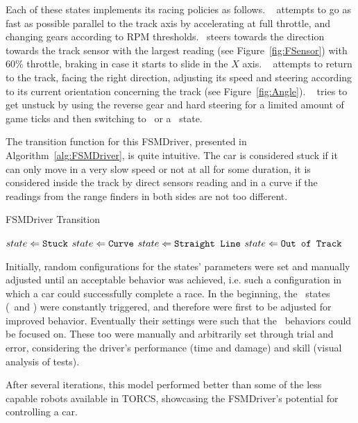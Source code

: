 Each of these states implements its racing policies as follows. \SL~ attempts to go as fast as possible parallel to the track axis by accelerating at full throttle, and changing gears according to RPM thresholds. \C~steers towards the direction towards the track sensor with the largest reading (see Figure~\ref{fig:FSensor}) with 60\% throttle, braking in case it starts to slide in the $X$ axis. \OT~ attempts to return to the track, facing the right direction, adjusting its speed and steering according to its current orientation concerning the track (see Figure~\ref{fig:Angle}). \St~ tries to get unstuck by using the reverse gear and hard steering for a limited amount of game ticks and then switching to \OT~or a \racing~state.

The transition function for this FSMDriver, presented in Algorithm~\ref{alg:FSMDriver}, is quite intuitive. The car is considered stuck if it can only move in a very slow speed or not at all for some duration, it is considered inside the track by direct sensors reading and in a curve if the readings from the range finders in both sides are not too different.

\begin{algorithm}[!h]%
\caption{FSMDriver Transition}%
\label{alg:FSMDriver}%
\begin{algorithmic}
        \STATE $state \Leftarrow \texttt{Stuck}$
    \ELSE
				\STATE $state \Leftarrow \texttt{Curve}$
			\ELSE
				\STATE $state \Leftarrow \texttt{Straight Line}$
			\ENDIF
		\ELSE
			\STATE $state \Leftarrow \texttt{Out of Track}$
		\ENDIF
	\ENDIF
\end{algorithmic}
\end{algorithm}

Initially, random configurations for the states' parameters were set and manually adjusted until an acceptable behavior was achieved, i.e. such a configuration in which a car could successfully complete a race. In the beginning, the \recovery~states (\OT~and \St) were constantly triggered, and therefore were first to be adjusted for improved behavior. Eventually their settings were such that the \racing~behaviors could be focused on. These too were manually and arbitrarily set through trial and error, considering the driver's performance (time and damage) and skill (visual analysis of tests).

After several iterations, this model performed better than some of the less capable robots available in TORCS, showcasing the FSMDriver's potential for controlling a car.



